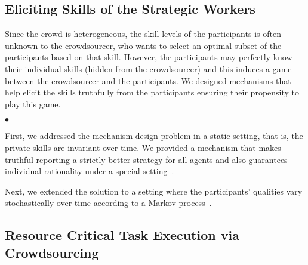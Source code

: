 \documentclass[11pt,psfig,letter]{article}
\newcommand{\squishlisttwo}{
\begin{list}{$\bullet$}
{ \setlength{\itemsep}{0pt}
\setlength{\parsep}{0pt}
\setlength{\topsep}{0pt}
\setlength{\partopsep}{0pt}
\setlength{\leftmargin}{1em}
\setlength{\labelwidth}{1.5em}
\setlength{\labelsep}{0.5em} } }
\newcommand{\squishend}{
\end{list} }
\begin{document}
\subsection*{Eliciting Skills of the Strategic Workers}

Since the crowd is heterogeneous, the skill levels of the participants is often unknown to the crowdsourcer, who wants to select an optimal subset of the participants based on that skill. However, the participants may perfectly know their individual skills (hidden from the crowdsourcer) and this induces a game between the crowdsourcer and the participants. We designed mechanisms that help elicit the skills truthfully from the participants ensuring their propensity to play this game. 
\squishlisttwo
 \item First, we addressed the mechanism design problem in a static setting, that is, the private skills are invariant over time. 
 We provided a mechanism that makes truthful reporting a strictly better strategy for all agents and also guarantees individual rationality under a special setting~\cite{Nath2013a}.
 \item Next, we extended the solution to a setting where the participants' qualities vary stochastically over time according to a Markov process~\cite{Nath2011}.
\squishend

\subsection*{Resource Critical Task Execution via Crowdsourcing}
\end{document}
